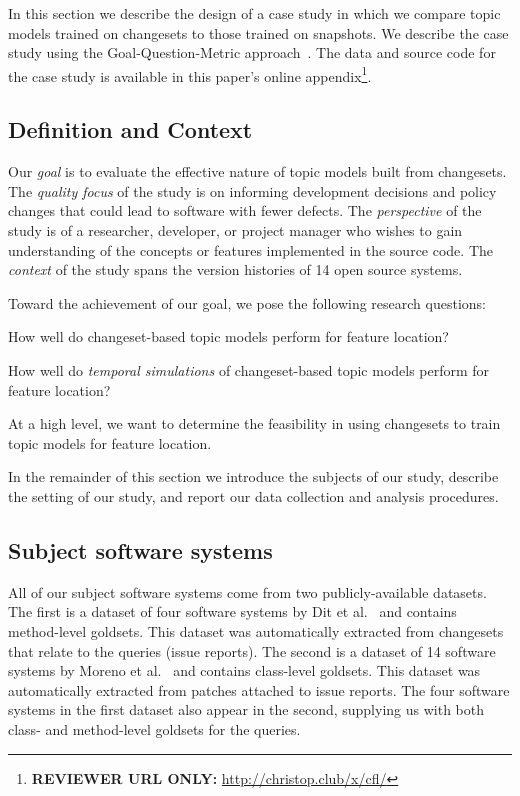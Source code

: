 
In this section we describe the design of a case study in which we
compare topic models trained on changesets to those trained on snapshots.
We describe the case study using the Goal-Question-Metric approach~\cite{Basili-etal:94}.
The data and source code for the case study is available in this paper's online
appendix\footnote{\textbf{REVIEWER URL ONLY:} \url{http://christop.club/x/cfl/}}.

\subsection{Definition and Context}

Our \textit{goal} is to evaluate the effective nature of topic models built
from changesets.
The \textit{quality focus} of the study is on informing development
decisions and policy changes that could lead to software with fewer
defects.
The \textit{perspective} of the study is of a researcher, developer, or
project manager who wishes to gain understanding of the concepts or
features implemented in the source code.
The \textit{context} of the study spans the version histories of 14
open source systems.

Toward the achievement of our goal, we pose the following research questions:
\begin{description}[font=\itshape\mdseries,leftmargin=10mm,style=sameline]
    \item[RQ1] How well do changeset-based topic models perform for feature location?
    \item[RQ2] How well do \emph{temporal simulations} of changeset-based topic models perform for feature location?
\end{description}
At a high level, we want to determine the feasibility in using changesets
to train topic models for feature location.

In the remainder of this section we introduce the subjects of our study,
describe the setting of our study, and report our data collection and analysis procedures.


\subsection{Subject software systems}

All of our subject software systems come from two publicly-available
datasets.
The first is a dataset of four software systems by Dit et al.~\cite{Dit-etal:2013} and contains method-level goldsets.
This dataset was automatically extracted from changesets that relate to the queries (issue reports).
The second is a dataset of 14 software systems by Moreno et al.~\cite{Moreno-etal:2014} and contains class-level goldsets.
This dataset was automatically extracted from patches attached to issue reports.
The four software systems in the first dataset also appear in the second,
supplying us with both class- and method-level goldsets for the queries.

